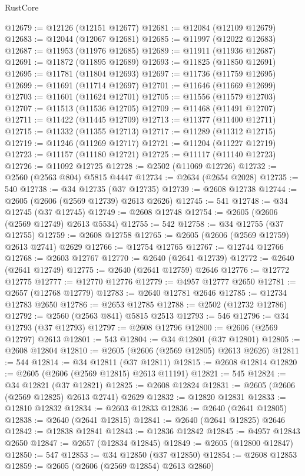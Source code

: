 \begin{lexlean}{RustCore}
\begin{coremodule}
@12679 := @12126 (@12151 @12677)
@12681 := @12084 (@12109 @12679)
@12683 := @12044 (@12067 @12681)
@12685 := @11997 (@12022 @12683)
@12687 := @11953 (@11976 @12685)
@12689 := @11911 (@11936 @12687)
@12691 := @11872 (@11895 @12689)
@12693 := @11825 (@11850 @12691)
@12695 := @11781 (@11804 @12693)
@12697 := @11736 (@11759 @12695)
@12699 := @11691 (@11714 @12697)
@12701 := @11646 (@11669 @12699)
@12703 := @11601 (@11624 @12701)
@12705 := @11556 (@11579 @12703)
@12707 := @11513 (@11536 @12705)
@12709 := @11468 (@11491 @12707)
@12711 := @11422 (@11445 @12709)
@12713 := @11377 (@11400 @12711)
@12715 := @11332 (@11355 @12713)
@12717 := @11289 (@11312 @12715)
@12719 := @11246 (@11269 @12717)
@12721 := @11204 (@11227 @12719)
@12723 := @11157 (@11180 @12721)
@12725 := @11117 (@11140 @12723)
@12726 := @11092 @12725
@12728 := @2502 (@11069 @12726)
@12732 := @2560 (@2563 @804) @5815 @4447
@12734 := @2634 (@2654 @2028)
@12735 := 540
@12738 := @34 @12735 (@37 @12735)
@12739 := @2608 @12738
@12744 := @2605 (@2606 (@2569 @12739) @2613 @2626)
@12745 := 541
@12748 := @34 @12745 (@37 @12745)
@12749 := @2608 @12748
@12754 := @2605 (@2606 (@2569 @12749) @2613 @5534)
@12755 := 542
@12758 := @34 @12755 (@37 @12755)
@12759 := @2608 @12758
@12765 := @2605 (@2606 (@2569 @12759) @2613 @2741) @2629
@12766 := @12754 @12765
@12767 := @12744 @12766
@12768 := @2603 @12767
@12770 := @2640 (@2641 @12739)
@12772 := @2640 (@2641 @12749)
@12775 := @2640 (@2641 @12759) @2646
@12776 := @12772 @12775
@12777 := @12770 @12776
@12779 := @4957 @12777 @2650
@12781 := @2657 (@12768 @12779)
@12783 := @2640 @12781 @2646
@12785 := @12734 @12783 @2650
@12786 := @2653 @12785
@12788 := @2502 (@12732 @12786)
@12792 := @2560 (@2563 @841) @5815 @2513
@12793 := 546
@12796 := @34 @12793 (@37 @12793)
@12797 := @2608 @12796
@12800 := @2606 (@2569 @12797) @2613
@12801 := 543
@12804 := @34 @12801 (@37 @12801)
@12805 := @2608 @12804
@12810 := @2605 (@2606 (@2569 @12805) @2613 @2626)
@12811 := 544
@12814 := @34 @12811 (@37 @12811)
@12815 := @2608 @12814
@12820 := @2605 (@2606 (@2569 @12815) @2613 @11191)
@12821 := 545
@12824 := @34 @12821 (@37 @12821)
@12825 := @2608 @12824
@12831 := @2605 (@2606 (@2569 @12825) @2613 @2741) @2629
@12832 := @12820 @12831
@12833 := @12810 @12832
@12834 := @2603 @12833
@12836 := @2640 (@2641 @12805)
@12838 := @2640 (@2641 @12815)
@12841 := @2640 (@2641 @12825) @2646
@12842 := @12838 @12841
@12843 := @12836 @12842
@12845 := @4957 @12843 @2650
@12847 := @2657 (@12834 @12845)
@12849 := @2605 (@12800 @12847)
@12850 := 547
@12853 := @34 @12850 (@37 @12850)
@12854 := @2608 @12853
@12859 := @2605 (@2606 (@2569 @12854) @2613 @2860)

\end{coremodule}
\end{lexlean}
